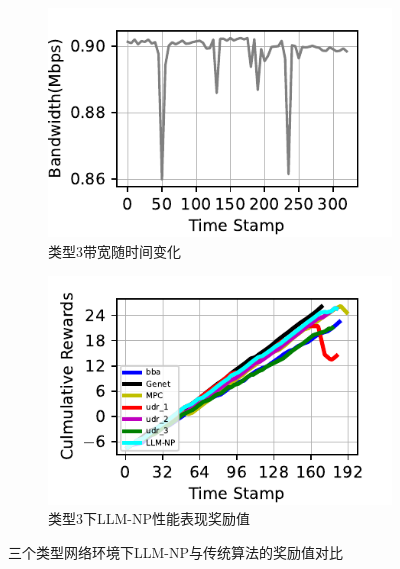 \begin{figure}[ht]
\begin{subfigure}[t]{0.47\linewidth}
  \centering
  \includegraphics[width=\linewidth]{figures/chap04/evaluation_multialgo/bandwidth_88_plot.pdf}
  \caption{类型3带宽随时间变化}
  \label{type3-band-eva}
\end{subfigure}%
\begin{subfigure}[t]{0.47\linewidth}
  \centering
  \includegraphics[width=\linewidth]{figures/chap04/evaluation_multialgo/test_88_plot.pdf}
  \caption{类型3下LLM-NP性能表现奖励值}
  \label{type3-rew-eva}
\end{subfigure}

\caption{三个类型网络环境下LLM-NP与传统算法的奖励值对比}
\label{fig:multi-algo-eva}
\end{figure}
